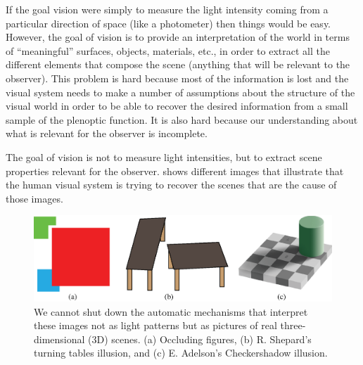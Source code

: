 If the goal vision were  simply to measure the light intensity coming from a particular direction of space (like a photometer) then things would be easy. However, the goal of vision is to provide an interpretation of the world in terms of ``meaningful'' surfaces, objects, materials, etc., in order to extract all the different elements that compose the scene (anything that will be relevant to the observer). This problem is hard because most of the information is lost and the visual system needs to make a number of assumptions about the structure of the visual world in order to be able to recover the desired information from a small sample of the plenoptic function. It is also hard because our understanding about what is relevant for the observer is incomplete. 

The goal of vision is not to measure light intensities, but to extract scene properties relevant for the observer. \Fig{\ref{fig:measuringScene}} shows different images that illustrate that the human visual system is trying to recover the scenes that are the cause of those images. 


\begin{figure}[t]
\centerline{
\includegraphics[width=1\linewidth]{figures/taxonomy/measuringScene2.eps}
} 
\caption{We cannot shut down the automatic mechanisms that interpret these images not as light patterns but as pictures of real three-dimensional (3D) scenes. (a) Occluding figures, (b) R. Shepard's turning tables illusion, and (c) E. Adelson's Checkershadow illusion.
} 
\label{fig:measuringScene}
\end{figure}


